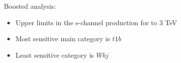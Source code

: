 {{        \vspace{0.75cm}

        \footnotesize
        Boosted analysis:
        
        \begin{itemize}
        \item Upper limits in the s-channel
          production for  to 3 TeV
        \item Most sensitive main category is $t1b$
        \item Least sensitive category is $Wbj$
        \end{itemize}
      }
}


